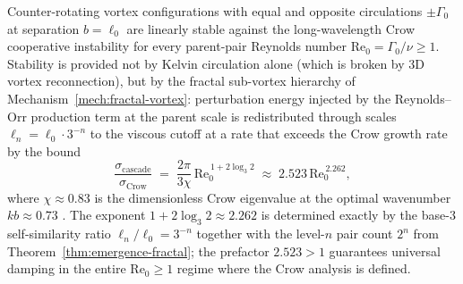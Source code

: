 \begin{theorem}\label{thm:topological-stability}
Counter-rotating vortex configurations with equal and opposite circulations $\pm \Gamma_0$ at separation $b = \ell_0$ are linearly stable against the long-wavelength Crow cooperative instability\cite{crow1970stability,leweke1998cooperative} for every parent-pair Reynolds number $\mathrm{Re}_0 = \Gamma_0/\nu \ge 1$. Stability is provided not by Kelvin circulation alone (which is broken by 3D vortex reconnection), but by the fractal sub-vortex hierarchy of Mechanism~\ref{mech:fractal-vortex}: perturbation energy injected by the Reynolds--Orr production term at the parent scale is redistributed through scales $\ell_n = \ell_0 \cdot 3^{-n}$ to the viscous cutoff at a rate that exceeds the Crow growth rate by the bound
\begin{equation}\label{eq:cascade-vs-crow}
\frac{\sigma_{\mathrm{cascade}}}{\sigma_{\mathrm{Crow}}} \;=\; \frac{2\pi}{3\chi}\,\mathrm{Re}_0^{\,1+2\log_3 2} \;\approx\; 2.523\,\mathrm{Re}_0^{\,2.262},
\end{equation}
where $\chi \approx 0.83$ is the dimensionless Crow eigenvalue at the optimal wavenumber $kb \approx 0.73$ \cite{crow1970stability,leweke1998cooperative}. The exponent $1 + 2\log_3 2 \approx 2.262$ is determined exactly by the base-$3$ self-similarity ratio $\ell_n/\ell_0 = 3^{-n}$ together with the level-$n$ pair count $2^n$ from Theorem~\ref{thm:emergence-fractal}; the prefactor $2.523 > 1$ guarantees universal damping in the entire $\mathrm{Re}_0 \ge 1$ regime where the Crow analysis is defined\cite{joseph1976stability,drazin2004hydrodynamic}.
\end{theorem}

